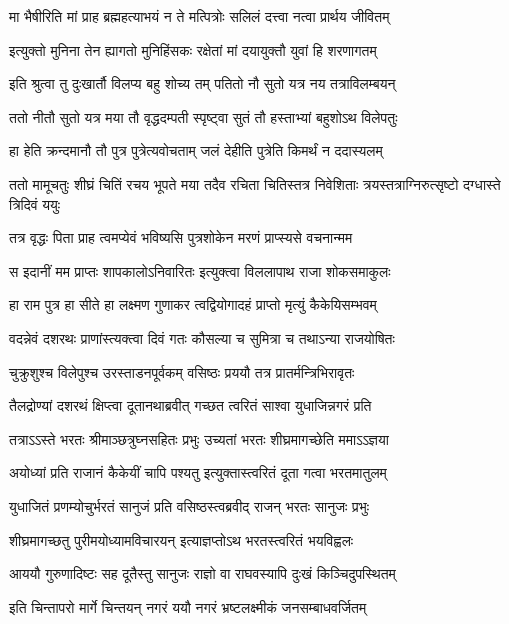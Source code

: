 \twolineshloka
{मा भैषीरिति मां प्राह ब्रह्महत्याभयं न ते}
{मत्पित्रोः सलिलं दत्त्वा नत्वा प्रार्थय जीवितम्} %

\twolineshloka
{इत्युक्तो मुनिना तेन ह्यागतो मुनिहिंसकः}
{रक्षेतां मां दयायुक्तौ युवां हि शरणागतम्} %

\twolineshloka
{इति श्रुत्वा तु दुःखार्तौ विलप्य बहु शोच्य तम्}
{पतितो नौ सुतो यत्र नय तत्राविलम्बयन्} %

\twolineshloka
{ततो नीतौ सुतो यत्र मया तौ वृद्धदम्पती}
{स्पृष्ट्वा सुतं तौ हस्ताभ्यां बहुशोऽथ विलेपतुः} %

\twolineshloka
{हा हेति क्रन्दमानौ तौ पुत्र पुत्रेत्यवोचताम्}
{जलं देहीति पुत्रेति किमर्थं न ददास्यलम्} %

\threelineshloka
{ततो मामूचतुः शीघ्रं चितिं रचय भूपते}
{मया तदैव रचिता चितिस्तत्र निवेशिताः}
{त्रयस्तत्राग्निरुत्सृष्टो दग्धास्ते त्रिदिवं ययुः} %

\twolineshloka
{तत्र वृद्धः पिता प्राह त्वमप्येवं भविष्यसि}
{पुत्रशोकेन मरणं प्राप्स्यसे वचनान्मम} %

\twolineshloka
{स इदानीं मम प्राप्तः शापकालोऽनिवारितः}
{इत्युक्त्वा विललापाथ राजा शोकसमाकुलः} %

\twolineshloka
{हा राम पुत्र हा सीते हा लक्ष्मण गुणाकर}
{त्वद्वियोगादहं प्राप्तो मृत्युं कैकेयिसम्भवम्} %

\twolineshloka
{वदन्नेवं दशरथः प्राणांस्त्यक्त्वा दिवं गतः}
{कौसल्या च सुमित्रा च तथाऽन्या राजयोषितः} %

\twolineshloka
{चुक्रुशुश्च विलेपुश्च उरस्ताडनपूर्वकम्}
{वसिष्ठः प्रययौ तत्र प्रातर्मन्त्रिभिरावृतः} %

\twolineshloka
{तैलद्रोण्यां दशरथं क्षिप्त्वा दूतानथाब्रवीत्}
{गच्छत त्वरितं साश्वा युधाजिन्नगरं प्रति} %

\twolineshloka
{तत्राऽऽस्ते भरतः श्रीमाञ्छत्रुघ्नसहितः प्रभुः}
{उच्यतां भरतः शीघ्रमागच्छेति ममाऽऽज्ञया} %

\twolineshloka
{अयोध्यां प्रति राजानं कैकेयीं चापि पश्यतु}
{इत्युक्तास्त्वरितं दूता गत्वा भरतमातुलम्} %

\twolineshloka
{युधाजितं प्रणम्योचुर्भरतं सानुजं प्रति}
{वसिष्ठस्त्वब्रवीद् राजन् भरतः सानुजः प्रभुः} %

\twolineshloka
{शीघ्रमागच्छतु पुरीमयोध्यामविचारयन्}
{इत्याज्ञप्तोऽथ भरतस्त्वरितं भयविह्वलः} %

\twolineshloka
{आययौ गुरुणादिष्टः सह दूतैस्तु सानुजः}
{राज्ञो वा राघवस्यापि दुःखं किञ्चिदुपस्थितम्} %

\twolineshloka
{इति चिन्तापरो मार्गे चिन्तयन् नगरं ययौ}
{नगरं भ्रष्टलक्ष्मीकं जनसम्बाधवर्जितम्} %

